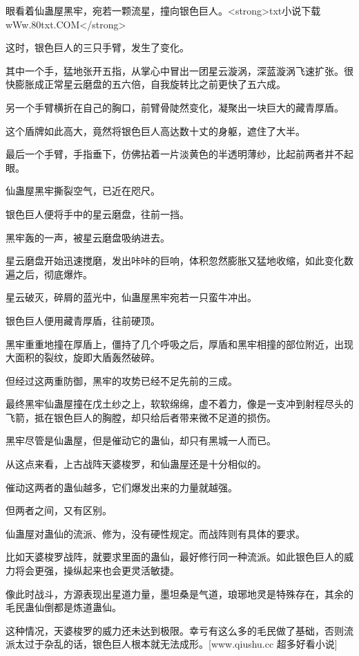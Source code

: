 
\begin{this_body}

眼看着仙蛊屋黑牢，宛若一颗流星，撞向银色巨人。<strong>txt小说下载wWw.80txt.COM</strong>

这时，银色巨人的三只手臂，发生了变化。

其中一个手，猛地张开五指，从掌心中冒出一团星云漩涡，深蓝漩涡飞速扩张。很快膨胀成正常星云磨盘的五六倍，自我旋转比之前更快了五六成。

另一个手臂横折在自己的胸口，前臂骨陡然变化，凝聚出一块巨大的藏青厚盾。

这个盾牌如此高大，竟然将银色巨人高达数十丈的身躯，遮住了大半。

最后一个手臂，手指垂下，仿佛拈着一片淡黄色的半透明薄纱，比起前两者并不起眼。

仙蛊屋黑牢撕裂空气，已近在咫尺。

银色巨人便将手中的星云磨盘，往前一挡。

黑牢轰的一声，被星云磨盘吸纳进去。

星云磨盘开始迅速搅磨，发出咔咔的巨响，体积忽然膨胀又猛地收缩，如此变化数遍之后，彻底爆炸。

星云破灭，碎屑的蓝光中，仙蛊屋黑牢宛若一只蛮牛冲出。

银色巨人便用藏青厚盾，往前硬顶。

黑牢重重地撞在厚盾上，僵持了几个呼吸之后，厚盾和黑牢相撞的部位附近，出现大面积的裂纹，旋即大盾轰然破碎。

但经过这两重防御，黑牢的攻势已经不足先前的三成。

最终黑牢仙蛊屋撞在戊土纱之上，软软绵绵，虚不着力，像是一支冲到射程尽头的飞箭，抵在银色巨人的胸膛，却只给后者带来微不足道的损伤。

黑牢尽管是仙蛊屋，但是催动它的蛊仙，却只有黑城一人而已。

从这点来看，上古战阵天婆梭罗，和仙蛊屋还是十分相似的。

催动这两者的蛊仙越多，它们爆发出来的力量就越强。

但两者之间，又有区别。

仙蛊屋对蛊仙的流派、修为，没有硬性规定。而战阵则有具体的要求。

比如天婆梭罗战阵，就要求里面的蛊仙，最好修行同一种流派。如此银色巨人的威力将会更强，操纵起来也会更灵活敏捷。

像此时战斗，方源表现出星道力量，墨坦桑是气道，琅琊地灵是特殊存在，其余的毛民蛊仙倒都是炼道蛊仙。

这种情况，天婆梭罗的威力还未达到极限。幸亏有这么多的毛民做了基础，否则流派太过于杂乱的话，银色巨人根本就无法成形。[www.qiushu.cc 超多好看小说]


\end{this_body}
